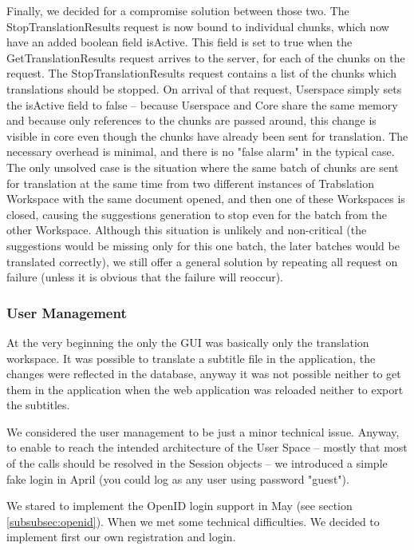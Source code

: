 Finally, we decided for a compromise solution between those two. The StopTranslationResults request is now bound to individual chunks, which now have an added boolean field isActive. This field is set to true when the GetTranslationResults request arrives to the server, for each of the chunks on the request. The StopTranslationResults request contains a list of the chunks which translations should be stopped. On arrival of that request, Userspace simply sets the isActive field to false -- because Userspace and Core share the same memory and because only references to the chunks are passed around, this change is visible in core even though the chunks have already been sent for translation. The necessary overhead is minimal, and there is no "false alarm" in the typical case. The only unsolved case is the situation where the same batch of chunks are sent for translation at the same time from two different instances of Trabslation Workspace with the same document opened, and then one of these Workspaces is closed, causing the suggestions generation to stop even for the batch from the other Workspace. Although this situation is unlikely and non-critical (the suggestions would be missing only for this one batch, the later batches would be translated correctly), we still offer a general solution by repeating all request on failure (unless it is obvious that the failure will reoccur).

\subsubsection{User Management}

At the very beginning the only the GUI was basically only the translation workspace. It was possible to translate a subtitle file in the application, the changes were reflected in the database, anyway it was not possible neither to get them in the application when the web application was reloaded neither to export the subtitles.

We considered the user management to be just a minor technical issue. Anyway, to enable to reach the intended architecture of the User Space -- mostly that most of the calls should be resolved in the Session objects -- we introduced a simple fake login in April (you could log as any user using password "guest").

We stared to implement the OpenID login support in May (see section \ref{subsubsec:openid}). When we met some technical difficulties. We decided to implement first our own registration and login.

